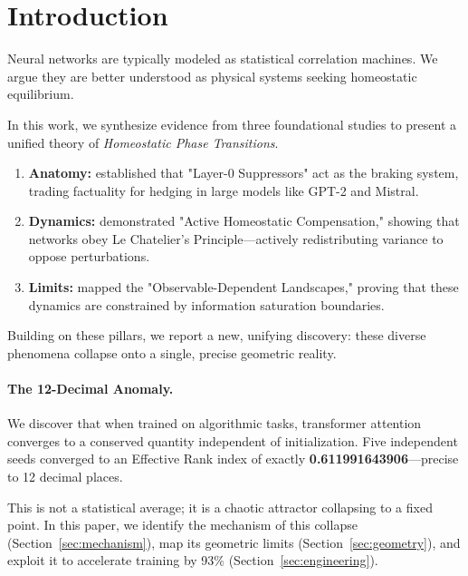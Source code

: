 \section{Introduction}

Neural networks are typically modeled as statistical correlation machines. We argue they are better understood as physical systems seeking homeostatic equilibrium.

In this work, we synthesize evidence from three foundational studies to present a unified theory of \emph{Homeostatic Phase Transitions}.
\begin{enumerate}
    \item \textbf{Anatomy:} \cite{thompson2025layer0} established that "Layer-0 Suppressors" act as the braking system, trading factuality for hedging in large models like GPT-2 and Mistral.
    \item \textbf{Dynamics:} \cite{thompson2025compensation} demonstrated "Active Homeostatic Compensation," showing that networks obey Le Chatelier's Principle—actively redistributing variance to oppose perturbations.
    \item \textbf{Limits:} \cite{thompson2025timescale} mapped the "Observable-Dependent Landscapes," proving that these dynamics are constrained by information saturation boundaries.
\end{enumerate}

Building on these pillars, we report a new, unifying discovery: these diverse phenomena collapse onto a single, precise geometric reality.

\paragraph{The 12-Decimal Anomaly.}
We discover that when trained on algorithmic tasks, transformer attention converges to a conserved quantity independent of initialization. Five independent seeds converged to an Effective Rank index of exactly \textbf{0.611991643906}—precise to 12 decimal places.

This is not a statistical average; it is a chaotic attractor collapsing to a fixed point. In this paper, we identify the mechanism of this collapse (Section~\ref{sec:mechanism}), map its geometric limits (Section~\ref{sec:geometry}), and exploit it to accelerate training by 93\% (Section~\ref{sec:engineering}).
